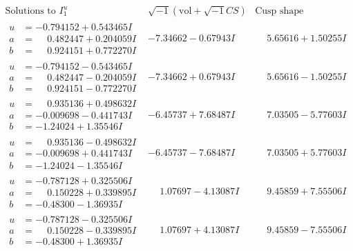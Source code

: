 \documentclass[1p]{elsarticle_modified}
\theoremstyle{definition}
\newcommand{\I}{\sqrt{-1}}
\begin{document}
$$\begin{array}{c|c|c}  
\text{Solutions to }I^u_{1}& \I (\text{vol} + \sqrt{-1}CS) & \text{Cusp shape}\\
 \hline 
\begin{aligned}
u &= -0.794152 + 0.543465 I \\
a &= \phantom{-}0.482447 + 0.204059 I \\
b &= \phantom{-}0.924151 + 0.772270 I\end{aligned}
 & -7.34662 - 0.67943 I & \phantom{-}5.65616 + 1.50255 I \\ \hline\begin{aligned}
u &= -0.794152 - 0.543465 I \\
a &= \phantom{-}0.482447 - 0.204059 I \\
b &= \phantom{-}0.924151 - 0.772270 I\end{aligned}
 & -7.34662 + 0.67943 I & \phantom{-}5.65616 - 1.50255 I \\ \hline\begin{aligned}
u &= \phantom{-}0.935136 + 0.498632 I \\
a &= -0.009698 - 0.441743 I \\
b &= -1.24024 + 1.35546 I\end{aligned}
 & -6.45737 + 7.68487 I & \phantom{-}7.03505 - 5.77603 I \\ \hline\begin{aligned}
u &= \phantom{-}0.935136 - 0.498632 I \\
a &= -0.009698 + 0.441743 I \\
b &= -1.24024 - 1.35546 I\end{aligned}
 & -6.45737 - 7.68487 I & \phantom{-}7.03505 + 5.77603 I \\ \hline\begin{aligned}
u &= -0.787128 + 0.325506 I \\
a &= \phantom{-}0.150228 + 0.339895 I \\
b &= -0.48300 - 1.36935 I\end{aligned}
 & \phantom{-}1.07697 - 4.13087 I & \phantom{-}9.45859 + 7.55506 I \\ \hline\begin{aligned}
u &= -0.787128 - 0.325506 I \\
a &= \phantom{-}0.150228 - 0.339895 I \\
b &= -0.48300 + 1.36935 I\end{aligned}
 & \phantom{-}1.07697 + 4.13087 I & \phantom{-}9.45859 - 7.55506 I \\ \hline\begin{aligned}

\end{aligned}
\end{array}$$
\end{document}
